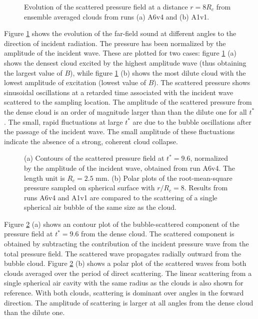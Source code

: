 \documentclass{jfm}
\begin{document}
\begin{figure}
  \center
  \caption{Evolution of the scattered pressure field at a distance $r=8R_c$ from ensemble averaged clouds from runs (a) A6v4 and (b) A1v1.
  }\label{fig:t_p} 
\end{figure}
Figure \ref{fig:t_p} shows the evolution of the far-field sound at different angles to the direction of incident radiation.  The pressure has been normalized by the amplitude of the incident wave.  These are plotted for two cases: figure \ref{fig:t_p} (a) shows the densest cloud excited by the highest amplitude wave (thus obtaining the largest value of $B$), while figure \ref{fig:t_p} (b) shows the most dilute cloud with the lowest amplitude of excitation (lowest value of $B$). 
The scattered pressure shows sinusoidal oscillations at a retarded time associated with the incident wave scattered to the sampling location.
The amplitude of the scattered pressure from the dense cloud is an order of magnitude larger than than the dilute one for all $t^*$.
The small, rapid fluctuations at large $t^*$ are due to the bubble oscillations after the passage of the incident wave. The small amplitude of these fluctuations indicate the absence of a strong, coherent cloud collapse.

\begin{figure}
  \center
  \caption{(a) Contours of the scattered pressure field at $t^*=9.6$, normalized by the amplitude of the incident wave, obtained from run A6v4. The length unit is $R_c=2.5$ mm. (b) Polar plots of the root-mean-square pressure sampled on spherical surface with $r/R_c=8$. Results from runs A6v4 and A1v1 are compared to the scattering of a single spherical air bubble of the same size as the cloud.}
   \label{fig:pres_contour} 
\end{figure}
Figure \ref{fig:pres_contour} (a) shows an contour plot of the bubble-scattered component of the pressure field at $t^*=9.6$ from the dense cloud. The scattered component is obtained by subtracting the contribution of the incident pressure wave from the total pressure field. The scattered wave propagates radially outward from the bubble cloud.
Figure \ref{fig:pres_contour} (b) shows a polar plot of the scattered waves from both clouds averaged over the period of direct scattering.
The linear scattering from a single spherical air cavity with the same radius as the clouds is also shown for reference.
With both clouds, scattering is dominant over angles in the forward direction.
The amplitude of scattering is larger at all angles from the dense cloud than the dilute one.
\end{document}
